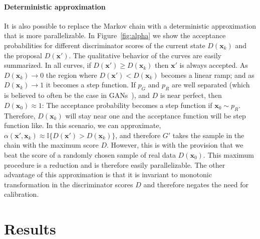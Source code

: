 \documentclass{article}
\renewcommand{\vec}[1]{{\boldsymbol{\mathbf{#1}}}} %
\newcommand{\I}{\mathbb{I}}
\newcommand{\sample}{\sim}
\newcommand{\PG}{{p_G}}
\newcommand{\PR}{{p_R}}
\newcommand{\accept}{\alpha}
\begin{document}
\paragraph{Deterministic approximation}
It is also possible to replace the Markov chain with a deterministic approximation that is more parallelizable.
In Figure~\ref{fig:alpha} we show the acceptance probabilities for different discriminator scores of the current state $D(\vec x_k)$ and the proposal $D(\vec x')$.
The qualitative behavior of the curves are easily summarized.
In all curves, if $D(\vec x') \geq D(\vec x_k)$ then $\vec x'$ is always accepted.
As $D(\vec x_k) \rightarrow 0$ the region where $D(\vec x') < D(\vec x_k)$ becomes a linear ramp; and as $D(\vec x_k) \rightarrow 1$ it becomes a step function.
If $\PG$ and $\PR$ are well separated (which is believed to often be the case in GANs~\citep{Arjovsky2017}), and $D$ is near perfect, then $D(\vec x_0) \approx 1$: The acceptance probability becomes a step function if $\vec x_0 \sample \PR$.
Therefore, $D(\vec x_k)$ will stay near one and the acceptance function will be step function like.
In this scenario, we can approximate, $\accept(\vec x', \vec x_k) \approx \I\{D(\vec x') > D(\vec x_k)\}$, and therefore $G'$ takes the sample in the chain with the maximum score $D$.
However, this is with the provision that we beat the score of a randomly chosen sample of real data $D(\vec x_0)$.
This maximum procedure is a reduction and is therefore easily parallelizable.
The other advantage of this approximation is that it is invariant to monotonic transformation in the discriminator scores $D$ and therefore negates the need for calibration.


\section{Results}

\end{document}
